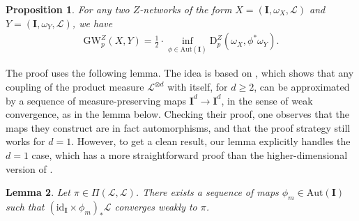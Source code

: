 \documentclass{article}
\newtheorem{proposition}{Proposition}[section]
\newtheorem{lemma}[proposition]{Lemma}
\theoremstyle{definition}
\newcommand{\dgwz}{\mathrm{GW}_p^Z}
\newcommand{\dpz}{\mathrm{D}^Z_p}
\begin{document}
\begin{proposition}
    \label{prop:zg_as_quotient_by_aut}
    For any two $Z$-networks of the form $X = (\mathbf{I}, \omega_X, \mathscr{L})$ and $Y = (\mathbf{I}, \omega_Y, \mathscr{L})$, we have
    \begin{align}   
        \dgwz(X, Y) = \tfrac{1}{2} \cdot \inf_{\phi \in \mathrm{Aut}(\mathbf{I})} \dpz(\omega_X, \phi^* \omega_Y).
    \end{align}
\end{proposition}

The proof uses the following lemma. The idea is based on \cite[Theorem 1.1.(i)]{brenier2003approximation}, which shows that any coupling of the product measure $\mathscr{L}^{\otimes d}$ with itself, for $d \geq 2$, can be approximated by a sequence of measure-preserving maps $\mathbf{I}^d \to \mathbf{I}^d$, in the sense of weak convergence, as in the lemma below. Checking their proof, one observes that the maps they construct are in fact automorphisms, and that the proof strategy still works for $d=1$. However, to get a clean result, our lemma explicitly handles the $d=1$ case, which has a more straightforward proof than the higher-dimensional version of \cite{brenier2003approximation}.

\begin{lemma}\label{lem:map_approximation}
Let $\pi \in \Pi(\mathscr{L},\mathscr{L})$. There exists a sequence of maps $\phi_m \in \mathrm{Aut}(\mathbf{I})$ such that $(\mathrm{id}_\mathbf{I} \times \phi_m)_\ast \mathscr{L}$ converges weakly to $\pi$. 
\end{lemma}
\end{document}
